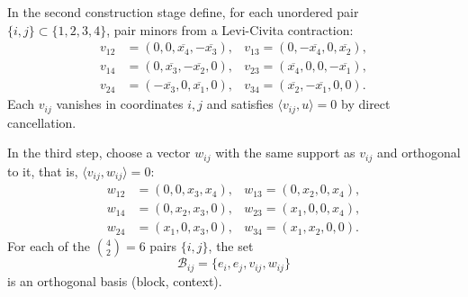 \documentclass[%
  reprint,
  superscriptaddress,
  showpacs,
  showkeys,
  amsmath,amssymb,
  pra,
  longbibliography,
  floatfix,
  x11names
]{revtex4-2}
\newcommand{\rev}[1]{{#1}}
\begin{document}
In the second construction stage define, for each unordered pair $\{i,j\}\subset\{1,2,3,4\}$, pair minors from a Levi-Civita contraction:
\begin{align*}
v_{12} &= (0,0,\overline{x_4},-\overline{x_3}), &
v_{13}  = (0,-\overline{x_4},0,\overline{x_2}), \\
v_{14} &= (0,\overline{x_3},-\overline{x_2},0), &
v_{23}  = (\overline{x_4},0,0,-\overline{x_1}), \\
v_{24} &= (-\overline{x_3},0,\overline{x_1},0), &
v_{34}  = (\overline{x_2},-\overline{x_1},0,0).
\end{align*}
Each $v_{ij}$ vanishes in coordinates $i,j$ and satisfies $\langle v_{ij},u\rangle=0$ by direct cancellation.

In the third step, choose a vector $w_{ij}$ with the same support as $v_{ij}$ and orthogonal to it, that is, $\langle v_{ij},w_{ij}\rangle=0$:
\begin{align*}
w_{12}&=(0,0,x_3,x_4), &
w_{13} =(0,x_2,0,x_4), \\
w_{14}&=(0,x_2,x_3,0), &
w_{23} =(x_1,0,0,x_4), \\
w_{24}&=(x_1,0,x_3,0), &
w_{34} =(x_1,x_2,0,0).
\end{align*}
\rev{For each of the $\binom{4}{2}=6$ pairs $\{i,j\}$, the set}
\[
\mathcal{B}_{ij}=\{e_i, e_j, v_{ij}, w_{ij}\}
\]
is an orthogonal basis (block, context).
\end{document}
